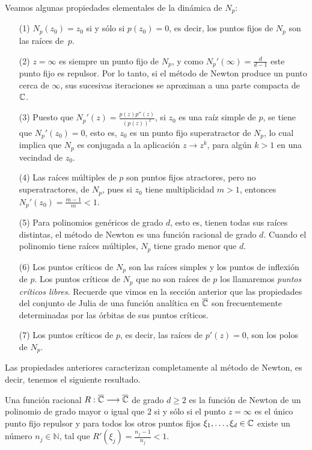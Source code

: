 Veamos algunas propiedades elementales de la dinámica de
$N_p$:
\begin{itemize}
\item[(1)]  $N_p(z_0) = z_0$ si y sólo si $p(z_0) =  0$,
es decir, los puntos fijos de $ N_p$ son las raíces de~$p$.

\item[(2)]  $ z = \infty$ es siempre un punto fijo de $ N_p$,
y como $   N_p' (\infty) = \frac{d}{d-1}$ este punto fijo es
repulsor. Por lo tanto, si el método de Newton produce un punto
cerca de $ \infty$, sus sucesivas iteraciones se aproximan a
una parte compacta de $\mathbb{C}$.

\item[(3)]  Puesto que $N_p'(z) = \frac{p(z) p''(z)}{(p(z))^2}$,
si $ z_0$ es una raíz simple de $p$,  se tiene que
$ N_p'(z_0) = 0$, esto es, $ z_0$ es un punto fijo
superatractor de $N_p$, lo cual implica que $ N_p$ es
conjugada a la aplicación $ z \to z^k$, para algún $k >
1$ en una vecindad de $z_0$.

\item[(4)]  Las raíces múltiples de $p$ son puntos fijos atractores,
pero no superatractores, de $ N_p $, pues si $z_0$ tiene
mul\-ti\-pli\-ci\-dad $ m > 1$, entonces $ N_p'(z_0) =
\frac{m-1}{m} < 1$.

\item[(5)]  Para polinomios genéricos de grado $ d$, esto es, tienen todas sus raíces distintas, el método
de Newton es una función racional de grado $d$. Cuando el
polinomio tiene raíces múltiples, $N_p$ tiene grado
menor que $d$.

\item[(6)]  Los puntos críticos de $ N_p$ son las raíces simples
y los puntos de inflexión de $p$. Los puntos críticos
de $N_p$ que no son raíces de $p$ los llamaremos \emph{puntos críticos libres}. 
Recuerde que vimos en la sección
anterior que las propiedades del conjunto de Julia de una
función analítica en $ \overline{\mathbb{C}}$ son
frecuentemente determinadas por las órbitas de sus puntos
críticos.%
 
\item[(7)]  Los puntos críticos de $p$, es decir, las raíces
de $ p'(z) = 0$, son los polos de $N_p$. 
\end{itemize}

Las propiedades  anteriores caracterizan completamente al método de Newton, es decir, tenemos el siguiente resultado.

\begin{teorema}
Una función racional $R:\overline{\mathbb{C}}\longrightarrow \overline{\mathbb{C}}$ de grado $d\ge 2$ es la función de Newton de un polinomio  de grado mayor o igual que $2$ si y sólo si el punto $z=\infty$ es el único punto fijo repulsor y para todos los otros puntos fijos $\xi_1,\ldots, \xi_d\in \mathbb{C}$ existe un número $n_j\in \mathbb{N}$, tal que $R'(\xi_j)=\frac{n_j-1}{n_j}<1$.
\end{teorema}

